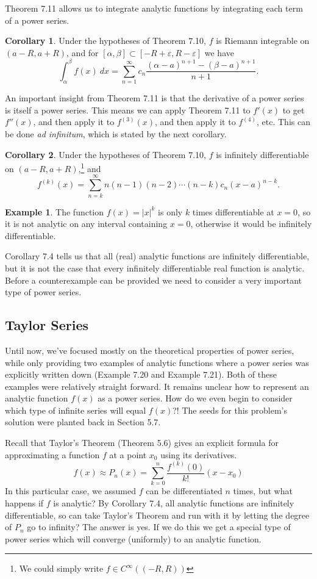 \documentclass{article}
\theoremstyle{definition}
\newtheorem{corollary}{Corollary}[section]
\newtheorem{example}{Example}[section]
\begin{document}
Theorem 7.11 allows us to integrate  analytic functions by integrating each term of a power series. 
\begin{corollary}
	Under the hypotheses of Theorem 7.10, $ f $ is Riemann integrable on $ (a-R,a+R) $, and for $ [\alpha,\beta]\subset [-R+\varepsilon,R-\varepsilon] $ we have $$ \int_{\alpha}^{\beta}f(x)\ dx=\sum_{n=1}^{\infty}c_n\frac{(\alpha-a)^{n+1}-(\beta-a)^{n+1}}{n+1}.$$
\end{corollary}

An important insight from Theorem 7.11 is that the derivative of a power series is itself a power series. This means we can apply Theorem 7.11 to $ f'(x) $ to get $ f''(x) $, and then apply it to $ f^{(3)}(x) $, and then apply it to $ f^{(4)} $, etc. This can be done \textit{ad infinitum}, which is stated by the next corollary.  
\begin{corollary}
	Under the hypotheses of Theorem 7.10, $ f $ is infinitely differentiable on $ (a-R,a+R) $,\footnote{We could simply write $ f\in C^\infty((-R,R)) $} and $$f^{(k)}(x)=\sum_{n=k}^{\infty}n(n-1)(n-2)\cdots(n-k)c_n(x-a)^{n-k}.$$
\end{corollary}
\begin{example}
	The function $ f(x)=|x|^k $ is only $ k $ times differentiable at $ x = 0 $, so it is not analytic on any interval containing $ x=0 $, otherwise it would be infinitely differentiable. 
\end{example}
Corollary 7.4 tells us that all (real) analytic functions are infinitely differentiable, but it is not the case that every infinitely differentiable real function is analytic. Before a counterexample can be provided we need to consider a very important type of power series.

\subsection{Taylor Series}
Until now, we've focused mostly on the theoretical properties of power series, while only providing two examples of analytic functions where a power series was explicitly written down (Example 7.20 and Example 7.21). Both of these examples were relatively straight forward. It remains unclear how to represent an analytic function $ f(x) $ as a power series. How do we even begin to consider which type of infinite series will equal $ f(x) $?! The seeds for this problem's solution were planted back in Section 5.7. 

Recall that Taylor's Theorem (Theorem 5.6) gives an explicit formula for approximating a function $ f $ at a point $ x_0 $ using its derivatives. 
$$ f(x) \approx P_n(x)=\sum_{k=0}^{n}\frac{f^{(k)}(0)}{k!}(x-x_0) $$ 
In this particular case, we assumed $ f $ can be differentiated $ n $ times, but what happens if $ f $ is analytic? By Corollary 7.4, all analytic functions are infinitely differentiable, so can take Taylor's Theorem and run with it by letting the degree of $ P_n $ go to infinity? The answer is yes. If we do this we get a special type of power series which will converge (uniformly) to an analytic function. 
\end{document}
